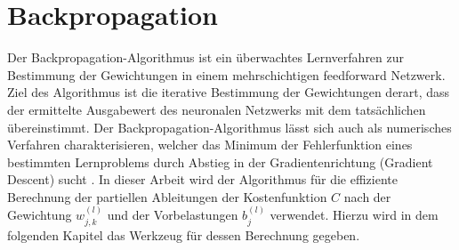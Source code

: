 \section{Backpropagation}
\label{chap:backprop}
Der Backpropagation-Algorithmus ist ein überwachtes Lernverfahren zur Bestimmung der Gewichtungen in einem mehrschichtigen feedforward Netzwerk. Ziel des Algorithmus ist die iterative Bestimmung der Gewichtungen derart, dass der ermittelte Ausgabewert des neuronalen Netzwerks mit dem tatsächlichen übereinstimmt. Der Backpropagation-Algorithmus lässt sich auch als numerisches Verfahren charakterisieren, welcher das Minimum der Fehlerfunktion eines bestimmten Lernproblems durch Abstieg in der Gradientenrichtung (Gradient Descent) sucht \cite[S. 71]{zander:2013}.
In dieser Arbeit wird der Algorithmus für die effiziente Berechnung der partiellen Ableitungen der Kostenfunktion $C$ nach der Gewichtung $w_{j,k}^{(l)}$ und der Vorbelastungen $b_j^{(l)}$ verwendet. Hierzu wird in dem folgenden Kapitel das Werkzeug für dessen Berechnung gegeben. \\

